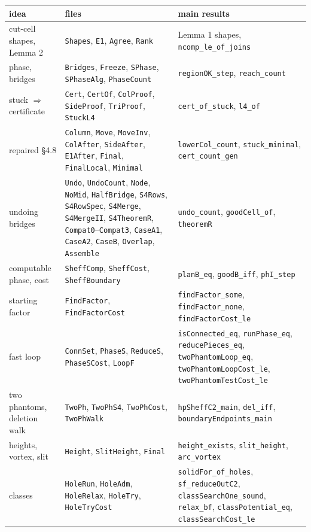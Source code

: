 \documentclass[11pt]{article}
\theoremstyle{plain}
\theoremstyle{definition}
\theoremstyle{remark}
\newcommand{\lean}[1]{\texttt{#1}}
\begin{document}
\begin{center}
\small
\begin{tabular}{@{}p{}p{}p{}@{}}
\toprule
idea & files & main results\\
\midrule
cut-cell shapes, Lemma 2 & \lean{Shapes}, \lean{E1}, \lean{Agree}, \lean{Rank} & Lemma 1 shapes, \lean{ncomp\_le\_of\_joins}\\
phase, bridges & \lean{Bridges}, \lean{Freeze}, \lean{SPhase}, \lean{SPhaseAlg}, \lean{PhaseCount} & \lean{regionOK\_step}, \lean{reach\_count}\\
stuck $\Rightarrow$ certificate & \lean{Cert}, \lean{CertOf}, \lean{ColProof}, \lean{SideProof}, \lean{TriProof}, \lean{StuckL4} & \lean{cert\_of\_stuck}, \lean{l4\_of}\\
repaired \S4.8 & \lean{Column}, \lean{Move}, \lean{MoveInv}, \lean{ColAfter}, \lean{SideAfter}, \lean{E1After}, \lean{Final}, \lean{FinalLocal}, \lean{Minimal} & \lean{lowerCol\_count}, \lean{stuck\_minimal}, \lean{cert\_count\_gen}\\
undoing bridges & \lean{Undo}, \lean{UndoCount}, \lean{Node}, \lean{NoMid}, \lean{HalfBridge}, \lean{S4Rows}, \lean{S4RowSpec}, \lean{S4Merge}, \lean{S4MergeII}, \lean{S4TheoremR}, \lean{Compat0}--\lean{Compat3}, \lean{CaseA1}, \lean{CaseA2}, \lean{CaseB}, \lean{Overlap}, \lean{Assemble} & \lean{undo\_count}, \lean{goodCell\_of}, \lean{theoremR}\\
computable phase, cost & \lean{SheffComp}, \lean{SheffCost}, \lean{SheffBoundary} & \lean{planB\_eq}, \lean{goodB\_iff}, \lean{phI\_step}\\
starting factor & \lean{FindFactor}, \lean{FindFactorCost} & \lean{findFactor\_some}, \lean{findFactor\_none}, \lean{findFactorCost\_le}\\
fast loop & \lean{ConnSet}, \lean{PhaseS}, \lean{ReduceS}, \lean{PhaseSCost}, \lean{LoopF} & \lean{isConnected\_eq}, \lean{runPhase\_eq}, \lean{reducePieces\_eq}, \lean{twoPhantomLoop\_eq}, \lean{twoPhantomLoopCost\_le}, \lean{twoPhantomTestCost\_le}\\
two phantoms, deletion walk & \lean{TwoPh}, \lean{TwoPhS4}, \lean{TwoPhCost}, \lean{TwoPhWalk} & \lean{hpSheffC2\_main}, \lean{del\_iff}, \lean{boundaryEndpoints\_main}\\
heights, vortex, slit & \lean{Height}, \lean{SlitHeight}, \lean{Final} & \lean{height\_exists}, \lean{slit\_height}, \lean{arc\_vortex}\\
classes & \lean{HoleRun}, \lean{HoleAdm}, \lean{HoleRelax}, \lean{HoleTry}, \lean{HoleTryCost} & \lean{solidFor\_of\_holes}, \lean{sf\_reduceOutC2}, \lean{classSearchOne\_sound}, \lean{relax\_bf}, \lean{classPotential\_eq}, \lean{classSearchCost\_le}\\

\end{tabular}
\end{center}
\end{document}
